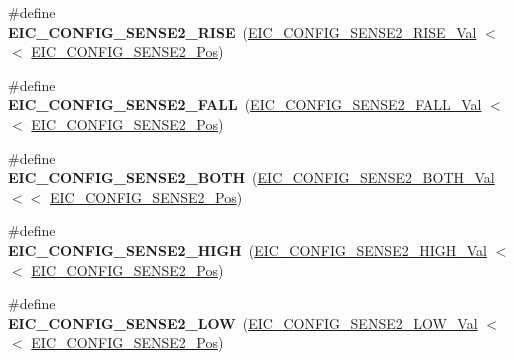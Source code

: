 \begin{DoxyCompactItemize}
\item 
\hypertarget{group___s_a_m_l21___e_i_c_ga13082e6745ab833b03c4ae3f6ac2987b}{}\#define {\bfseries E\+I\+C\+\_\+\+C\+O\+N\+F\+I\+G\+\_\+\+S\+E\+N\+S\+E2\+\_\+\+R\+I\+S\+E}~(\hyperlink{group___s_a_m_l21___e_i_c_ga4c6f24459946c4c716e15f887cf91732}{E\+I\+C\+\_\+\+C\+O\+N\+F\+I\+G\+\_\+\+S\+E\+N\+S\+E2\+\_\+\+R\+I\+S\+E\+\_\+\+Val}    $<$$<$ \hyperlink{group___s_a_m_l21___e_i_c_gaf67e9a2938eae7c6f9f4d19c405e243f}{E\+I\+C\+\_\+\+C\+O\+N\+F\+I\+G\+\_\+\+S\+E\+N\+S\+E2\+\_\+\+Pos})\label{group___s_a_m_l21___e_i_c_ga13082e6745ab833b03c4ae3f6ac2987b}

\item 
\hypertarget{group___s_a_m_l21___e_i_c_ga9fdf05ef44c96150dec20de4e599acca}{}\#define {\bfseries E\+I\+C\+\_\+\+C\+O\+N\+F\+I\+G\+\_\+\+S\+E\+N\+S\+E2\+\_\+\+F\+A\+L\+L}~(\hyperlink{group___s_a_m_l21___e_i_c_ga2f603343d04d42dfa3c238016be954b5}{E\+I\+C\+\_\+\+C\+O\+N\+F\+I\+G\+\_\+\+S\+E\+N\+S\+E2\+\_\+\+F\+A\+L\+L\+\_\+\+Val}    $<$$<$ \hyperlink{group___s_a_m_l21___e_i_c_gaf67e9a2938eae7c6f9f4d19c405e243f}{E\+I\+C\+\_\+\+C\+O\+N\+F\+I\+G\+\_\+\+S\+E\+N\+S\+E2\+\_\+\+Pos})\label{group___s_a_m_l21___e_i_c_ga9fdf05ef44c96150dec20de4e599acca}

\item 
\hypertarget{group___s_a_m_l21___e_i_c_ga714d2b832c236d31cca6edec3104a77d}{}\#define {\bfseries E\+I\+C\+\_\+\+C\+O\+N\+F\+I\+G\+\_\+\+S\+E\+N\+S\+E2\+\_\+\+B\+O\+T\+H}~(\hyperlink{group___s_a_m_l21___e_i_c_ga7809a27e221937b35d9e6b969a3771fb}{E\+I\+C\+\_\+\+C\+O\+N\+F\+I\+G\+\_\+\+S\+E\+N\+S\+E2\+\_\+\+B\+O\+T\+H\+\_\+\+Val}    $<$$<$ \hyperlink{group___s_a_m_l21___e_i_c_gaf67e9a2938eae7c6f9f4d19c405e243f}{E\+I\+C\+\_\+\+C\+O\+N\+F\+I\+G\+\_\+\+S\+E\+N\+S\+E2\+\_\+\+Pos})\label{group___s_a_m_l21___e_i_c_ga714d2b832c236d31cca6edec3104a77d}

\item 
\hypertarget{group___s_a_m_l21___e_i_c_ga3b91ead92d5a5e553982a5cc7fae8bf8}{}\#define {\bfseries E\+I\+C\+\_\+\+C\+O\+N\+F\+I\+G\+\_\+\+S\+E\+N\+S\+E2\+\_\+\+H\+I\+G\+H}~(\hyperlink{group___s_a_m_l21___e_i_c_ga949642d01c96957d1e5f9279d3b48c2c}{E\+I\+C\+\_\+\+C\+O\+N\+F\+I\+G\+\_\+\+S\+E\+N\+S\+E2\+\_\+\+H\+I\+G\+H\+\_\+\+Val}    $<$$<$ \hyperlink{group___s_a_m_l21___e_i_c_gaf67e9a2938eae7c6f9f4d19c405e243f}{E\+I\+C\+\_\+\+C\+O\+N\+F\+I\+G\+\_\+\+S\+E\+N\+S\+E2\+\_\+\+Pos})\label{group___s_a_m_l21___e_i_c_ga3b91ead92d5a5e553982a5cc7fae8bf8}

\item 
\hypertarget{group___s_a_m_l21___e_i_c_ga6ccc3301fd3545d826b275289fb05c99}{}\#define {\bfseries E\+I\+C\+\_\+\+C\+O\+N\+F\+I\+G\+\_\+\+S\+E\+N\+S\+E2\+\_\+\+L\+O\+W}~(\hyperlink{group___s_a_m_l21___e_i_c_ga475f78069ac4ecbb6c2115497fa686f0}{E\+I\+C\+\_\+\+C\+O\+N\+F\+I\+G\+\_\+\+S\+E\+N\+S\+E2\+\_\+\+L\+O\+W\+\_\+\+Val}     $<$$<$ \hyperlink{group___s_a_m_l21___e_i_c_gaf67e9a2938eae7c6f9f4d19c405e243f}{E\+I\+C\+\_\+\+C\+O\+N\+F\+I\+G\+\_\+\+S\+E\+N\+S\+E2\+\_\+\+Pos})\label{group___s_a_m_l21___e_i_c_ga6ccc3301fd3545d826b275289fb05c99}


\end{DoxyCompactItemize}
